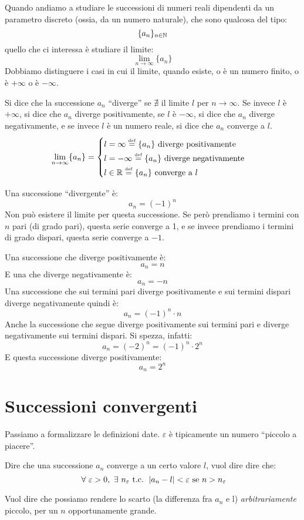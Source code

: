 
Quando andiamo a studiare le successioni di numeri reali dipendenti da un parametro discreto (ossia, da un numero naturale), che sono qualcosa del tipo:
\[
\{ a_n \}_{n \in \mathbb{N}}
\]
quello che ci interessa \`e studiare il limite:
\[
\lim_{n \to \infty} \{ a_n \}
\]
Dobbiamo distinguere i casi in cui il limite, quando esiste, o \`e un numero finito, o \`e $+\infty$ o \`e $-\infty$.

\begin{defn}
Si dice che la successione $a_n$ ``diverge'' se $\nexists$ il limite $l$ per $n \to \infty$. Se invece $l$ \`e $+ \infty$, si dice che $a_n$ diverge positivamente, se $l$ \`e $- \infty$, si dice che $a_n$ diverge negativamente, e se invece $l$ \`e un numero reale, si dice che $a_n$ converge a $l$.
\[
\lim_{n \to \infty} \{ a_n \} = 
\begin{cases}
l = \infty \overset{\underset{\mathrm{def}}{}}{=} \{ a_n \} \text{ diverge positivamente} \\
l = - \infty \overset{\underset{\mathrm{def}}{}}{=} \{ a_n \} \text{ diverge negativamente} \\
l \in \mathbb{R} \overset{\underset{\mathrm{def}}{}}{=} \{ a_n \} \text{ converge a } l
\end{cases}
\]
\end{defn}

Una successione ``divergente'' \`e:
\[
a_n = {\left( -1 \right)}^{n}
\]
Non pu\`o esistere il limite per questa successione. Se per\`o prendiamo i termini con $n$ pari (di grado pari), questa serie converge a 1, e se invece prendiamo i termini di grado dispari, questa serie converge a $-1$.

Una successione che diverge positivamente \`e:
\[
a_n = n
\]
E una che diverge negativamente \`e:
\[
a_n = -n
\]
Una successione che sui termini pari diverge positivamente e sui termini dispari diverge negativamente quindi \`e:
\[
a_n = {\left( -1 \right)}^{n} \cdot n
\]
Anche la successione che segue diverge positivamente sui termini pari e diverge negativamente sui termini dispari. Si spezza, infatti:
\[
a_n = {\left( -2 \right)}^{n} = {\left( -1 \right)}^{n} \cdot 2^n
\]
E questa successione diverge positivamente:
\[
a_n = 2^n
\]

\section{Successioni convergenti}

Passiamo a formalizzare le definizioni date. $\varepsilon$ \`e tipicamente un numero ``piccolo a piacere''. 
\begin{defn}
Dire che una successione $a_n$ converge a un certo valore $l$, vuol dire dire che:
\[
\forall \varepsilon > 0 , \exists n_{\varepsilon} \text{ t.c. } \abs{a_n - l} < \varepsilon \text{ se } n > n_{\varepsilon}
\]
\end{defn}
Vuol dire che possiamo rendere lo scarto (la differenza fra $a_n$ e l) \emph{arbitrariamente} piccolo, per un $n$ opportunamente grande.


